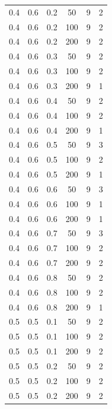 \documentclass[a4paper,14pt, unknownkeysallowed]{extreport}
\begin{document}
\begin{center}
\begin{longtable}[c]{|c|c|c|c|c|c|}
        \hline
         0.4 &  0.6 &  0.2 &   50 &     9 &     2 \\
         0.4 &  0.6 &  0.2 &  100 &     9 &     2 \\
         0.4 &  0.6 &  0.2 &  200 &     9 &     2 \\
        \hline
         0.4 &  0.6 &  0.3 &   50 &     9 &     2 \\
         0.4 &  0.6 &  0.3 &  100 &     9 &     2 \\
         0.4 &  0.6 &  0.3 &  200 &     9 &     1 \\
        \hline
         0.4 &  0.6 &  0.4 &   50 &     9 &     2 \\
         0.4 &  0.6 &  0.4 &  100 &     9 &     2 \\
         0.4 &  0.6 &  0.4 &  200 &     9 &     1 \\
        \hline
         0.4 &  0.6 &  0.5 &   50 &     9 &     3 \\
         0.4 &  0.6 &  0.5 &  100 &     9 &     2 \\
         0.4 &  0.6 &  0.5 &  200 &     9 &     1 \\
        \hline
         0.4 &  0.6 &  0.6 &   50 &     9 &     3 \\
         0.4 &  0.6 &  0.6 &  100 &     9 &     1 \\
         0.4 &  0.6 &  0.6 &  200 &     9 &     1 \\
        \hline
         0.4 &  0.6 &  0.7 &   50 &     9 &     3 \\
         0.4 &  0.6 &  0.7 &  100 &     9 &     2 \\
         0.4 &  0.6 &  0.7 &  200 &     9 &     2 \\
        \hline
         0.4 &  0.6 &  0.8 &   50 &     9 &     2 \\
         0.4 &  0.6 &  0.8 &  100 &     9 &     2 \\
         0.4 &  0.6 &  0.8 &  200 &     9 &     1 \\
        \hline
         0.5 &  0.5 &  0.1 &   50 &     9 &     2 \\
         0.5 &  0.5 &  0.1 &  100 &     9 &     2 \\
         0.5 &  0.5 &  0.1 &  200 &     9 &     2 \\
        \hline
         0.5 &  0.5 &  0.2 &   50 &     9 &     2 \\
         0.5 &  0.5 &  0.2 &  100 &     9 &     2 \\
         0.5 &  0.5 &  0.2 &  200 &     9 &     2 \\

\end{longtable}
\end{center}
\end{document}
